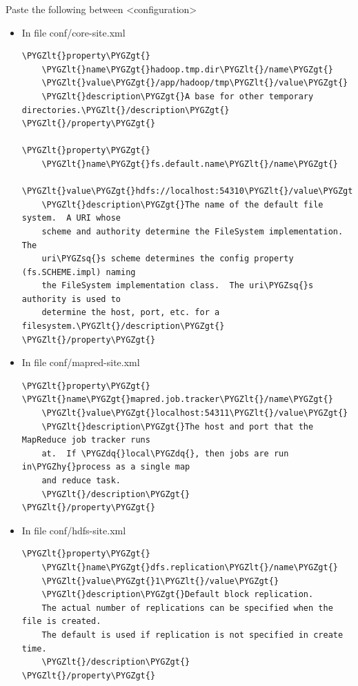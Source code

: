 \documentclass[letterpaper,10pt,english]{sphinxmanual}
\def\PYGZlt{\char`\<}
\def\PYGZgt{\char`\>}
\def\PYGZhy{\char`\-}
\def\PYGZsq{\char`\'}
\def\PYGZdq{\char`\"}
\begin{document}
Paste the following between \textless{}configuration\textgreater{}
\begin{itemize}
\item {} 
In file conf/core-site.xml

\begin{Verbatim}[commandchars=\\\{\}]
\PYGZlt{}property\PYGZgt{}
    \PYGZlt{}name\PYGZgt{}hadoop.tmp.dir\PYGZlt{}/name\PYGZgt{}
    \PYGZlt{}value\PYGZgt{}/app/hadoop/tmp\PYGZlt{}/value\PYGZgt{}
    \PYGZlt{}description\PYGZgt{}A base for other temporary directories.\PYGZlt{}/description\PYGZgt{}
\PYGZlt{}/property\PYGZgt{}

\PYGZlt{}property\PYGZgt{}
    \PYGZlt{}name\PYGZgt{}fs.default.name\PYGZlt{}/name\PYGZgt{}
    \PYGZlt{}value\PYGZgt{}hdfs://localhost:54310\PYGZlt{}/value\PYGZgt{}
    \PYGZlt{}description\PYGZgt{}The name of the default file system.  A URI whose
    scheme and authority determine the FileSystem implementation.  The
    uri\PYGZsq{}s scheme determines the config property (fs.SCHEME.impl) naming
    the FileSystem implementation class.  The uri\PYGZsq{}s authority is used to
    determine the host, port, etc. for a filesystem.\PYGZlt{}/description\PYGZgt{}
\PYGZlt{}/property\PYGZgt{}
\end{Verbatim}

\item {} 
In file conf/mapred-site.xml

\begin{Verbatim}[commandchars=\\\{\}]
\PYGZlt{}property\PYGZgt{}
\PYGZlt{}name\PYGZgt{}mapred.job.tracker\PYGZlt{}/name\PYGZgt{}
    \PYGZlt{}value\PYGZgt{}localhost:54311\PYGZlt{}/value\PYGZgt{}
    \PYGZlt{}description\PYGZgt{}The host and port that the MapReduce job tracker runs
    at.  If \PYGZdq{}local\PYGZdq{}, then jobs are run in\PYGZhy{}process as a single map
    and reduce task.
    \PYGZlt{}/description\PYGZgt{}
\PYGZlt{}/property\PYGZgt{}
\end{Verbatim}

\item {} 
In file conf/hdfs-site.xml

\begin{Verbatim}[commandchars=\\\{\}]
\PYGZlt{}property\PYGZgt{}
    \PYGZlt{}name\PYGZgt{}dfs.replication\PYGZlt{}/name\PYGZgt{}
    \PYGZlt{}value\PYGZgt{}1\PYGZlt{}/value\PYGZgt{}
    \PYGZlt{}description\PYGZgt{}Default block replication.
    The actual number of replications can be specified when the file is created.
    The default is used if replication is not specified in create time.
    \PYGZlt{}/description\PYGZgt{}
\PYGZlt{}/property\PYGZgt{}
\end{Verbatim}

\end{itemize}
\end{document}

